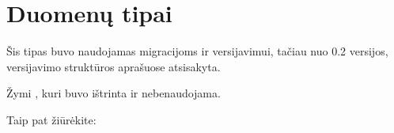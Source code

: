 \documentclass[letterpaper,10pt,lithuanian]{sphinxmanual}
\begin{document}
\sphinxstepscope


\section{Duomenų tipai}
\label{\detokenize{tipai:module-type}}\label{\detokenize{tipai:id1}}\label{\detokenize{tipai:duomenu-tipai}}\label{\detokenize{tipai::doc}}

\begin{fulllineitems}
\label{\detokenize{tipai:type.absent}}
\pysigstartsignatures
\pysigline
{}
\pysigstopsignatures
\sphinxAtStartPar
{}Šis tipas buvo naudojamas migracijoms ir versijavimui, tačiau nuo 0.2
versijos, versijavimo struktūros aprašuose atsisakyta.

\sphinxAtStartPar
Žymi {\hyperref[\detokenize{dimensijos:property}]{}}, kuri buvo ištrinta ir nebenaudojama.


\begin{sphinxseealso}{Taip pat žiūrėkite:}

\sphinxAtStartPar
{\hyperref[\detokenize{dimensijos:migrate}]{}}


\end{sphinxseealso}


\end{fulllineitems}

\end{document}
